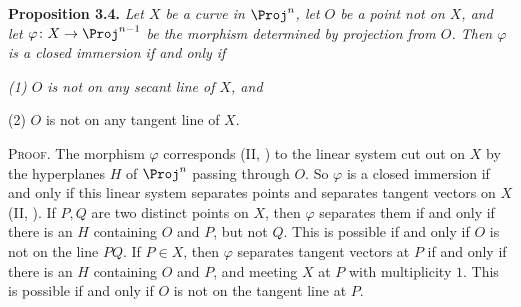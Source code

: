 {\medskip
\noindent\hypertarget{result-IV-3.4}{}\textbf{Proposition 3.4.} \emph{Let $X$ be a curve in $\Proj^n$, let $O$ be a point not on $X$, and let $\varphi\colon X\to\Proj^{n-1}$ be the morphism determined by projection from $O$. Then $\varphi$ is a closed immersion if and only if}
\par{\itshape\leftskip=11pt
\noindent\hypertarget{result-IV-3.4-1}{}(1) $O$ is not on any secant line of $X$, and

\noindent\hypertarget{result-IV-3.4-2}{}(2) $O$ is not on any tangent line of $X$.\par}

\smallskip
\noindent\textsc{Proof.} The morphism $\varphi$ corresponds (II, ) to the linear system cut out on $X$ by the hyperplanes $H$ of $\Proj^n$ passing through $O$. So $\varphi$ is a closed immersion if and only if this linear system separates points and separates tangent vectors on $X$ (II, ). If $P,Q$ are two distinct points on $X$, then $\varphi$ separates them if and only if there is an $H$ containing $O$ and $P$, but not $Q$. This is possible if and only if $O$ is not on the line $PQ$. If $P\in X$, then $\varphi$ separates tangent vectors at $P$ if and only if there is an $H$ containing $O$ and $P$, and meeting $X$ at $P$ with multiplicity $1$. This is possible if and only if $O$ is not on the tangent line at $P$.
}
